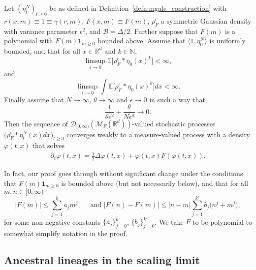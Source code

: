 \documentclass[EJP]{ejpecp} %
\newcommand{\IE}{\mathbb E}
\newcommand{\IR}{\mathbb R}
\newcommand{\IN}{\mathbb N}
\newcommand{\ind}{\mathbf{1}}
\newcommand{\DG}{\mathcal{B}}  %
\newcommand{\measures}{\mathcal{M}_F(\IR^d)} %
\begin{document}
\begin{theorem}
    \label{thm:local_convergence}
    Let $(\eta^N_t)_{t \geq 0}$
    be as defined in Definition~\ref{defn:mgale_construction} with
$r(x,m)\equiv 1\equiv \gamma(r,m)$, $F(x,m)\equiv F(m)$, 
$\rho^\epsilon_F$ a symmetric Gaussian density with variance
parameter $\epsilon^2$,
and $\DG=\Delta/2$. 
Further suppose that $F(m)$ is a polynomial with $F(m)\ind_{m\geq 0}$ bounded above.
Assume that $\langle 1,\eta_0^N\rangle$ is uniformly bounded, and that for all 
$x\in\IR^d$ and $k\in \IN$,
	\[
		\limsup_{\epsilon\to 0} 
		\IE\big[\rho_F^\epsilon*\eta_0(x)^k\big]<\infty,
	\]
	and 
\[
    \limsup_{\epsilon \to 0} \int \IE\big[\rho_F^\epsilon*\eta_0(x)^k\big] dx<\infty.
\]
Finally assume that $N \to \infty$, $\theta \to \infty$
and $\epsilon \to 0$ in such a way that
\begin{equation}
\frac{1}{\theta\epsilon^2}+\frac{\theta}{N\epsilon^d}\to 0.
\end{equation}
Then the sequence of 
    ${\mathcal D}_{[0,\infty)}(\measures)$-valued
stochastic processes $\big(\rho_F^\epsilon*\eta^N_t(x)dx\big)_{t \ge 0}$
converges weakly
to a measure-valued process with a density $\varphi(t, x)$
that solves
\begin{align}
	\label{target equation in local convergence}
        \partial_t \varphi(t,x) = \frac{1}{2} \Delta \varphi(t,x) +\varphi(t,x) F(\varphi(t,x)).
\end{align}
\end{theorem}

\begin{remark}
In fact,
our proof goes through without significant change under the conditions that
$F(m)\ind_{m\geq 0}$ is bounded above (but not necessarily below), and that
for all $m,n\in[0,\infty)$
\[
|F(m)|\leq\sum_{j=1}^ka_jm^j, \quad\mbox{ and }
|F(n)-F(m)|
\leq|n-m|\sum_{j=1}^{k'}b_j\Big(n^j+m^j\Big),
\]
for some non-negative constants $\{a_j\}_{j=0}^k$, $\{b_j\}_{j=0}^{k'}$.
We take $F$ to be polynomial to somewhat simplify notation in the proof.
\end{remark}

\subsection{Ancestral lineages in the scaling limit}
\label{sec:ancestral lineages}
\end{document}
